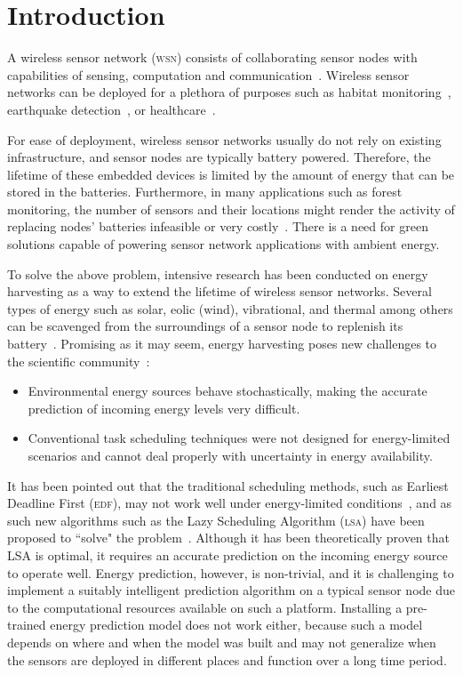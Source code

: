 \section{Introduction}\label{sec:introduction}

A wireless sensor network (\textsc{wsn}) consists of collaborating sensor nodes with capabilities of sensing, computation and communication~\cite{sudevalyam2010energy}. Wireless sensor networks can be deployed for a plethora of purposes such as habitat monitoring~\cite{mainwaring2002wireless}, earthquake detection~\cite{suzuki2007earthquake}, or healthcare~\cite{saadaoui2007architecture}. 

For ease of deployment, wireless sensor networks usually do not rely on existing infrastructure, and sensor nodes are typically battery powered. Therefore, the lifetime of these embedded devices is limited by the amount of energy that can be stored in the batteries. Furthermore, in many applications such as forest monitoring, the number of sensors and their locations might render the activity of replacing nodes' batteries infeasible or very costly~\cite{moser2007real}. 
There is a need for green solutions capable of powering sensor network applications 
with ambient energy. 

To solve the above problem, intensive research has been conducted on energy harvesting as a way to extend the lifetime of wireless sensor networks. Several types of energy such as solar, eolic (wind), vibrational, and thermal among others can be scavenged from the surroundings of a sensor node to replenish its battery~\cite{roundy2004power}. Promising as it may seem, energy harvesting poses new challenges to the scientific community~\cite{lu2010accurate}:

\begin{itemize}
	\item Environmental energy sources behave stochastically, making the accurate prediction of incoming energy levels very difficult.
	\item Conventional task scheduling techniques were not designed for energy-limited scenarios and cannot deal properly with uncertainty in energy availability.
\end{itemize}

It has been pointed out that the traditional scheduling methods, such as Earliest Deadline First (\textsc{edf}), may not work well under energy-limited conditions~\cite{moser2007real}, and as such new algorithms such as the Lazy Scheduling Algorithm (\textsc{lsa}) have been proposed to ``solve" the problem~\cite{moser2007real}. 
Although it has been theoretically proven that LSA is optimal, it requires an accurate prediction on the incoming energy source to operate well. 
Energy prediction, however, is non-trivial, and it is challenging 
to implement a suitably intelligent  prediction algorithm 
on a typical sensor node due to the computational resources available on such a platform. 
Installing a pre-trained energy prediction model does not work either, 
because such a model depends on where and when the model was built and may 
not generalize when the sensors are deployed in different places and 
function over a long time period. 

